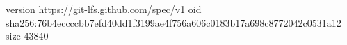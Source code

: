 version https://git-lfs.github.com/spec/v1
oid sha256:76b4eccccbb7efd40dd1f3199ae4f756a606c0183b17a698c8772042c0531a12
size 43840
